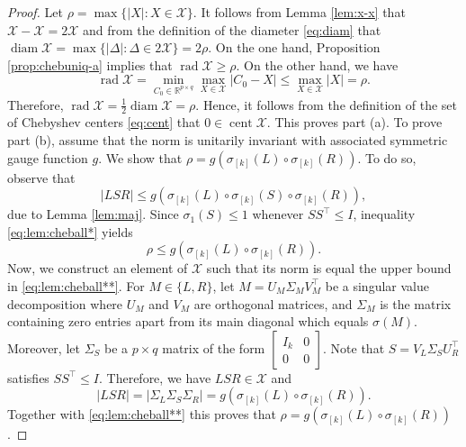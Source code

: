 \documentclass[pdflatex,sn-mathphys-num]{sn-jnl}%
\DeclareMathOperator{\rad}{rad}
\DeclareMathOperator{\cent}{cent}
\DeclareMathOperator{\diam}{diam}
\newcommand{\norm}[1]{\left|#1\right|}
\theoremstyle{thmstyleone}
\begin{document}
\begin{proof}
Let $\rho=\max\{\norm{X}:X\in\mathcal{X}\}$. It follows from Lemma \ref{lem:x-x} that $\mathcal{X}-\mathcal{X}=2\mathcal{X}$ and from the definition of the diameter \eqref{eq:diam} that $\diam\mathcal{X}=\max\{\norm{\Delta}:\Delta\in2\mathcal{X}\}=2\rho$. On the one hand, Proposition \ref{prop:chebuniq-a} implies that $\rad\mathcal{X}\geq \rho$. On the other hand, we have
\begin{equation}
\rad\mathcal{X}=\min_{C_0\in\mathbb{R}^{p\times q}} \max_{X\in\mathcal{X}} \norm{C_0-X}\leq \max_{X\in\mathcal{X}} \norm{X}=\rho.
\end{equation}
Therefore, $\rad\mathcal{X}=\tfrac{1}{2}\diam\mathcal{X}=\rho$. Hence, it follows from the definition of the set of Chebyshev centers \eqref{eq:cent} that $0\in\cent\mathcal{X}$. This proves part (a). To prove part (b), assume that the norm is unitarily invariant with associated symmetric gauge function $g$. We show that \mbox{$\rho=g(\sigma_{[k]}(L)\circ \sigma_{[k]}(R))$}. To do so, observe that
\begin{equation}
\label{eq:lem:cheball*}
\norm{LSR}\leq g(\sigma_{[k]}(L)\circ \sigma_{[k]}(S)\circ \sigma_{[k]}(R)),
\end{equation}
due to Lemma \ref{lem:maj}. Since $\sigma_1(S)\leq 1$ whenever $SS^\top\leq I$, inequality \eqref{eq:lem:cheball*} yields 
\begin{equation}
\label{eq:lem:cheball**}
\rho\leq g(\sigma_{[k]}(L)\circ \sigma_{[k]}(R)).
\end{equation}
Now, we construct an element of $\mathcal{X}$ such that its norm is equal the upper bound in \eqref{eq:lem:cheball**}. For $M\in\{L,R\}$, let $M=U_M\Sigma_M V_M^\top$ be a singular value decomposition where $U_M$ and $V_M$ are orthogonal matrices, and $\Sigma_M$ is the matrix containing zero entries apart from its main diagonal which equals $\sigma(M)$. Moreover, let $\Sigma_S$ be a $p\times q$ matrix of the form $\begin{bmatrix}
I_k & 0 \\ 0 & 0
\end{bmatrix}$. Note that $S=V_L\Sigma_S U_R^\top$ satisfies $SS^\top\leq I$. Therefore, we have $LSR\in\mathcal{X}$ and
\begin{equation}
\norm{LSR}=\norm{\Sigma_L\Sigma_S\Sigma_R}=g(\sigma_{[k]}(L)\circ \sigma_{[k]}(R)).
\end{equation}
Together with \eqref{eq:lem:cheball**} this proves that $\rho= g(\sigma_{[k]}(L)\circ \sigma_{[k]}(R))$. 
\end{proof}
\end{document}
